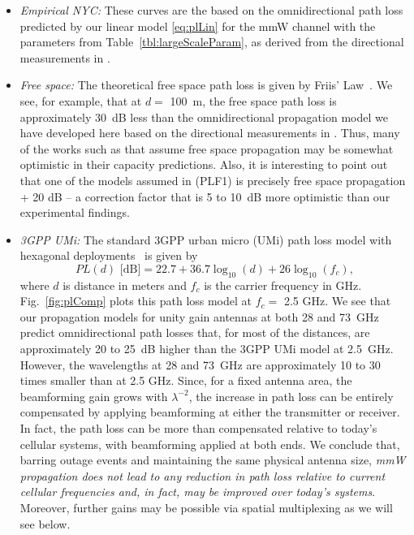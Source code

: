 \documentclass[journal]{IEEEtran}
\def\beq{\begin{equation}}
\def\eeq{\end{equation}}
\begin{document}
\begin{itemize}
\item \emph{Empirical NYC:}  These curves are the based on the omnidirectional
path loss predicted by our linear model \eqref{eq:plLin} for the mmW channel
with the parameters from Table~\ref{tbl:largeScaleParam},
as derived from the directional measurements in \cite{rappaportmillimeter}.

\item \emph{Free space:}  The theoretical free space path loss is
given by Friis' Law~\cite{Rappaport:02}.
We see, for example, that at $d=$ 100~m, the
free space path loss is approximately 30~dB
less than the omnidirectional propagation model we have
developed here based on the directional measurements in \cite{rappaportmillimeter}.
Thus, many of the works such as
\cite{ZhangMadhow1,AkoumAyaHeath:12,PietBRPC:12}
that assume free space propagation may be somewhat optimistic in
their capacity predictions.
Also, it is interesting to point out that
one of the models assumed in  \cite{KhanPi:11}
(PLF1) is precisely free space propagation + 20 dB -- a correction factor
that is 5 to 10~dB more optimistic than our experimental findings.

\item \emph{3GPP UMi:}  The standard 3GPP urban micro (UMi) path loss
model with
hexagonal deployments~\cite{3GPP36.814} is given by
\beq \label{eq:UMiPL}
    PL(d) \mbox{ [dB]} = 22.7 + 36.7\log_{10}(d) + 26 \log_{10}(f_c),
\eeq
where $d$ is distance in meters and $f_c$ is the carrier frequency in GHz.
Fig.~\ref{fig:plComp} plots this path loss model at $f_c=$ 2.5 GHz.
We see that our propagation models for unity gain antennas
at both 28 and 73~GHz predict
omnidirectional path losses that, for most of the distances,
are approximately 20 to 25~dB higher than the 3GPP UMi model at 2.5~GHz.
However, the wavelengths at 28 and 73~GHz are approximately 10 to 30
times smaller than at 2.5 GHz. Since, for a fixed antenna area,
the beamforming gain grows with $\lambda^{-2}$,
the increase in path loss can be entirely compensated
by applying beamforming at either the transmitter or receiver.
In fact, the path loss can be more than compensated relative to today's cellular systems,
with beamforming applied at both ends.
We conclude that, barring outage events and maintaining the same
physical antenna size, \emph{mmW propagation does not lead to any reduction
in path loss relative to current cellular frequencies and, in fact, may
be improved over today's systems}.
Moreover, further gains may be possible via spatial multiplexing
as we will see below.
\end{itemize}
\end{document}
